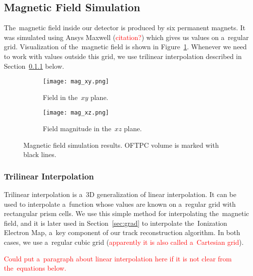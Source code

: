 		\subsection{Magnetic Field Simulation}
		\label{sec:mag}
			The~magnetic field inside our detector is produced by six permanent magnets. It was simulated using Ansys Maxwell (\textcolor{red}{citation?}) which gives us values on a~regular grid. Visualization of the~magnetic field is shown in Figure~\ref{fig:mag}. Whenever we need to work with values outside this grid, we use trilinear interpolation described in Section~\ref{sec:trilin} below.
			
			\begin{figure}
				\centering
				\begin{subfigure}[t]{0.45\textwidth}
					\centering
					\texttt{[image: mag\_xy.png]}
					\caption{Field in the~$xy$ plane.}
				\end{subfigure}
				\hfill
				\begin{subfigure}[t]{0.45\textwidth}
					\centering
					\texttt{[image: mag\_xz.png]}
					\caption{Field magnitude in the~$xz$ plane.}
				\end{subfigure}
				\caption{Magnetic field simulation results. \ac{OFTPC} volume is marked with black lines.}
				\label{fig:mag}
			\end{figure}
		
			\subsubsection{Trilinear Interpolation}
			\label{sec:trilin}
				Trilinear interpolation is a~3D generalization of linear interpolation. It can be used to interpolate a~function whose values are known on a~regular grid with rectangular prism cells. We use this simple method for interpolating the~magnetic field, and it is later used in Section~\ref{sec:grad} to interpolate the~Ionization Electron Map, a~key component of our track reconstruction algorithm. In both cases, we use a~regular cubic grid (\textcolor{red}{apparently it is also called a~Cartesian grid}).
				
				\textcolor{red}{Could put a~paragraph about linear interpolation here if it is not clear from the~equations below.}
				
